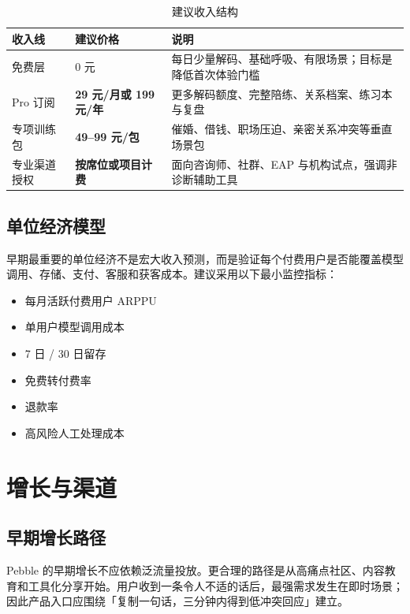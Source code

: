 \documentclass[UTF8,11pt,a4paper]{ctexart}
\newcommand{\assumption}[1]{\textcolor{PebbleClay}{\textbf{#1}}}
\newcommand{\thbg}[1]{\textcolor{PebbleInk}{\textbf{#1}}}
\begin{document}
\begin{table}[htbp]
\small
\caption{建议收入结构}
\centering
\begin{tabularx}{\textwidth}{p{2.8cm}p{3.2cm}Y}
\toprule
{}\thbg{收入线} & \thbg{建议价格} & \thbg{说明} \\
\midrule
免费层 & 0 元 & 每日少量解码、基础呼吸、有限场景；目标是降低首次体验门槛 \\
Pro 订阅 & \assumption{29 元/月或 199 元/年} & 更多解码额度、完整陪练、关系档案、练习本与复盘 \\
专项训练包 & \assumption{49--99 元/包} & 催婚、借钱、职场压迫、亲密关系冲突等垂直场景包 \\
专业渠道授权 & \assumption{按席位或项目计费} & 面向咨询师、社群、EAP 与机构试点，强调非诊断辅助工具 \\
\bottomrule
\end{tabularx}
\end{table}

\subsection{单位经济模型}

早期最重要的单位经济不是宏大收入预测，而是验证每个付费用户是否能覆盖模型调用、存储、支付、客服和获客成本。建议采用以下最小监控指标：

\begin{itemize}
  \item 每月活跃付费用户 ARPPU
  \item 单用户模型调用成本
  \item 7 日 / 30 日留存
  \item 免费转付费率
  \item 退款率
  \item 高风险人工处理成本
\end{itemize}

\section{增长与渠道}

\subsection{早期增长路径}

Pebble 的早期增长不应依赖泛流量投放。更合理的路径是从高痛点社区、内容教育和工具化分享开始。用户收到一条令人不适的话后，最强需求发生在即时场景；因此产品入口应围绕「复制一句话，三分钟内得到低冲突回应」建立。
\end{document}

